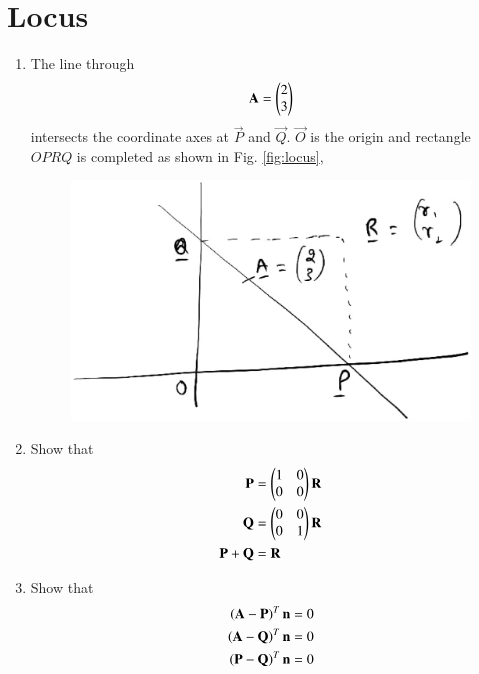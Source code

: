 \documentclass[journal,12pt,twocolumn]{IEEEtran}
\renewcommand\thesection{\arabic{section}}
\begin{document}
\begin{enumerate}[label=\thesection.\arabic*
,ref=\thesection.\theenumi]
\end{enumerate}


\section{Locus}
\begin{enumerate}[label=\thesection.\arabic*
,ref=\thesection.\theenumi]
\item The line through
\begin{equation}
\label{eq:locus}
\mathbf{A}=\begin{pmatrix}2\\3\end{pmatrix}
\end{equation}
intersects the coordinate axes at $\vec{P}$ and $\vec{Q}$.  $\vec{O}$ is the origin and rectangle $OPRQ$ is 
completed as shown in Fig. \eqref{fig:locus},
\begin{figure}
\centering
\includegraphics[width=\columnwidth]{./figs/locus.eps}
\caption{}
\label{fig:locus}
\end{figure}
\item Show that
\begin{align}
\mathbf{P}&= \begin{pmatrix}1 & 0\\ 0 & 0\end{pmatrix}\mathbf{R}
\label{eq:locusp}
\\
\mathbf{Q}&= \begin{pmatrix}0 & 0\\ 0 & 1\end{pmatrix}\mathbf{R}
\label{eq:locusq}
\\
\mathbf{P}+\mathbf{Q} &=\mathbf{R}
\label{eq:locusr}
\end{align}
\item Show that
\begin{align}
\begin{split}
\brak{\vec{A}-\vec{P}}^T\vec{n} &= 0
\\
\brak{\vec{A}-\vec{Q}}^T\vec{n} &= 0
\\
\brak{\vec{P}-\vec{Q}}^T\vec{n} &= 0

\end{split}
\end{align}
\end{enumerate}
\end{document}
